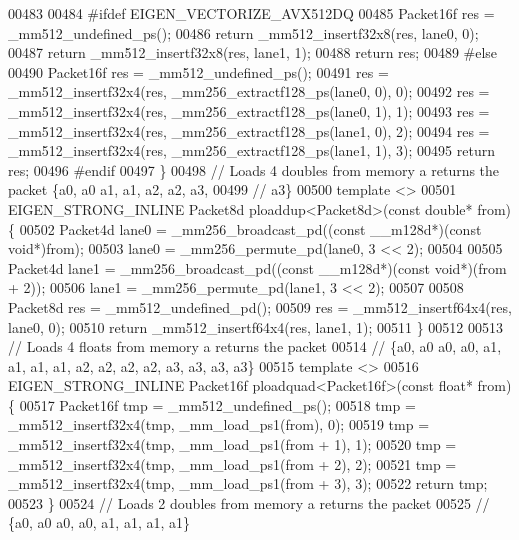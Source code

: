 \begin{DoxyCode}
00483 
00484 \textcolor{preprocessor}{#ifdef EIGEN\_VECTORIZE\_AVX512DQ}
00485   Packet16f res = \_mm512\_undefined\_ps();
00486   \textcolor{keywordflow}{return} \_mm512\_insertf32x8(res, lane0, 0);
00487   \textcolor{keywordflow}{return} \_mm512\_insertf32x8(res, lane1, 1);
00488   \textcolor{keywordflow}{return} res;
00489 \textcolor{preprocessor}{#else}
00490   Packet16f res = \_mm512\_undefined\_ps();
00491   res = \_mm512\_insertf32x4(res, \_mm256\_extractf128\_ps(lane0, 0), 0);
00492   res = \_mm512\_insertf32x4(res, \_mm256\_extractf128\_ps(lane0, 1), 1);
00493   res = \_mm512\_insertf32x4(res, \_mm256\_extractf128\_ps(lane1, 0), 2);
00494   res = \_mm512\_insertf32x4(res, \_mm256\_extractf128\_ps(lane1, 1), 3);
00495   \textcolor{keywordflow}{return} res;
00496 \textcolor{preprocessor}{#endif}
00497 \}
00498 \textcolor{comment}{// Loads 4 doubles from memory a returns the packet \{a0, a0  a1, a1, a2, a2, a3,}
00499 \textcolor{comment}{// a3\}}
00500 \textcolor{keyword}{template} <>
00501 EIGEN\_STRONG\_INLINE Packet8d ploaddup<Packet8d>(\textcolor{keyword}{const} \textcolor{keywordtype}{double}* from) \{
00502   Packet4d lane0 = \_mm256\_broadcast\_pd((\textcolor{keyword}{const} \_\_m128d*)(\textcolor{keyword}{const} \textcolor{keywordtype}{void}*)from);
00503   lane0 = \_mm256\_permute\_pd(lane0, 3 << 2);
00504 
00505   Packet4d lane1 = \_mm256\_broadcast\_pd((\textcolor{keyword}{const} \_\_m128d*)(\textcolor{keyword}{const} \textcolor{keywordtype}{void}*)(from + 2));
00506   lane1 = \_mm256\_permute\_pd(lane1, 3 << 2);
00507 
00508   Packet8d res = \_mm512\_undefined\_pd();
00509   res = \_mm512\_insertf64x4(res, lane0, 0);
00510   \textcolor{keywordflow}{return} \_mm512\_insertf64x4(res, lane1, 1);
00511 \}
00512 
00513 \textcolor{comment}{// Loads 4 floats from memory a returns the packet}
00514 \textcolor{comment}{// \{a0, a0  a0, a0, a1, a1, a1, a1, a2, a2, a2, a2, a3, a3, a3, a3\}}
00515 \textcolor{keyword}{template} <>
00516 EIGEN\_STRONG\_INLINE Packet16f ploadquad<Packet16f>(\textcolor{keyword}{const} \textcolor{keywordtype}{float}* from) \{
00517   Packet16f tmp = \_mm512\_undefined\_ps();
00518   tmp = \_mm512\_insertf32x4(tmp, \_mm\_load\_ps1(from), 0);
00519   tmp = \_mm512\_insertf32x4(tmp, \_mm\_load\_ps1(from + 1), 1);
00520   tmp = \_mm512\_insertf32x4(tmp, \_mm\_load\_ps1(from + 2), 2);
00521   tmp = \_mm512\_insertf32x4(tmp, \_mm\_load\_ps1(from + 3), 3);
00522   \textcolor{keywordflow}{return} tmp;
00523 \}
00524 \textcolor{comment}{// Loads 2 doubles from memory a returns the packet}
00525 \textcolor{comment}{// \{a0, a0  a0, a0, a1, a1, a1, a1\}}

\end{DoxyCode}
